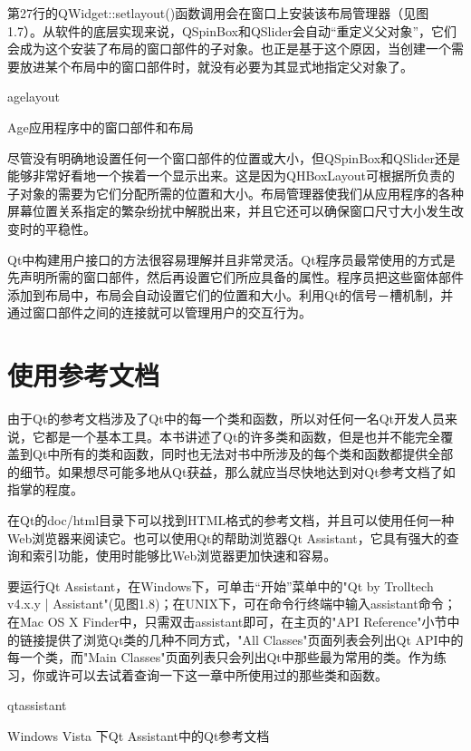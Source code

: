 \documentclass[11pt,oneside]{book}
\begin{document}
\begin{common-format}
第27行的QWidget::setlayout()函数调用会在窗口上安装该布局管理器（见图1.7）。从软件的底层实现来说，QSpinBox和QSlider会自动“重定义父对象”，它们会成为这个安装了布局的窗口部件的子对象。也正是基于这个原因，当创建一个需要放进某个布局中的窗口部件时，就没有必要为其显式地指定父对象了。

\begin{linefig}[0.8]{agelayout}
\caption{Age应用程序中的窗口部件和布局}
\label{fig:agelayout}
\end{linefig}

尽管没有明确地设置任何一个窗口部件的位置或大小，但QSpinBox和QSlider还是能够非常好看地一个挨着一个显示出来。这是因为QHBoxLayout可根据所负责的子对象的需要为它们分配所需的位置和大小。布局管理器使我们从应用程序的各种屏幕位置关系指定的繁杂纷扰中解脱出来，并且它还可以确保窗口尺寸大小发生改变时的平稳性。

Qt中构建用户接口的方法很容易理解并且非常灵活。Qt程序员最常使用的方式是先声明所需的窗口部件，然后再设置它们所应具备的属性。程序员把这些窗体部件添加到布局中，布局会自动设置它们的位置和大小。利用Qt的信号－槽机制，并通过窗口部件之间的连接就可以管理用户的交互行为。


\section{使用参考文档}
由于Qt的参考文档涉及了Qt中的每一个类和函数，所以对任何一名Qt开发人员来说，它都是一个基本工具。本书讲述了Qt的许多类和函数，但是也并不能完全覆盖到Qt中所有的类和函数，同时也无法对书中所涉及的每个类和函数都提供全部的细节。如果想尽可能多地从Qt获益，那么就应当尽快地达到对Qt参考文档了如指掌的程度。

在Qt的doc/html目录下可以找到HTML格式的参考文档，并且可以使用任何一种Web浏览器来阅读它。也可以使用Qt的帮助浏览器Qt Assistant，它具有强大的查询和索引功能，使用时能够比Web浏览器更加快速和容易。

要运行Qt Assistant，在Windows下，可单击“开始”菜单中的"Qt by Trolltech v4.x.y | Assistant"(见图1.8)；在UNIX下，可在命令行终端中输入assistant命令；在Mac  OS X Finder中，只需双击assistant即可，在主页的"API Reference"小节中的链接提供了浏览Qt类的几种不同方式，"All Classes"页面列表会列出Qt API中的每一个类，而"Main Classes"页面列表只会列出Qt中那些最为常用的类。作为练习，你或许可以去试着查询一下这一章中所使用过的那些类和函数。
\begin{linefig}[0.8]{qtassistant}
\caption{Windows Vista 下Qt Assistant中的Qt参考文档}
\label{fig:qtassistant}
\end{linefig}


\end{common-format}
\end{document}
